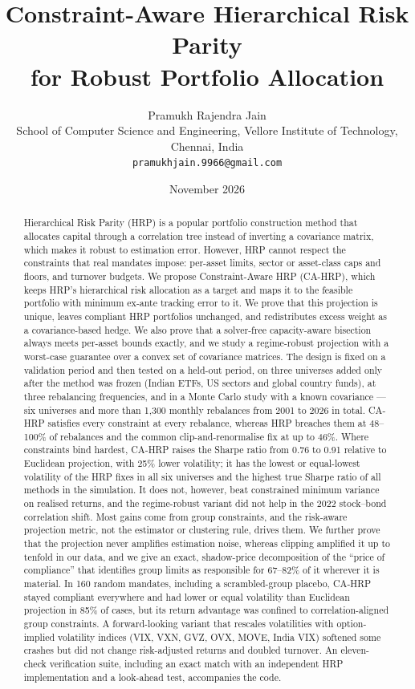 \documentclass[11pt]{article}
\title{Constraint-Aware Hierarchical Risk Parity\\for Robust Portfolio Allocation}
\author{Pramukh Rajendra Jain\\
\small School of Computer Science and Engineering, Vellore Institute of Technology, Chennai, India\\
\small \texttt{pramukhjain.9966@gmail.com}}
\date{November 2026}
\begin{document}
\maketitle

\begin{abstract}
Hierarchical Risk Parity (HRP) is a popular portfolio construction method that allocates
capital through a correlation tree instead of inverting a covariance matrix, which makes it
robust to estimation error. However, HRP cannot respect the constraints that real mandates
impose: per-asset limits, sector or asset-class caps and floors, and turnover budgets. We
propose Constraint-Aware HRP (CA-HRP), which keeps HRP's hierarchical risk allocation as a
target and maps it to the feasible portfolio with minimum ex-ante tracking error to it. We
prove that this projection is unique, leaves compliant HRP portfolios unchanged, and
redistributes excess weight as a covariance-based hedge. We also prove that a solver-free
capacity-aware bisection always meets per-asset bounds exactly, and we study a
regime-robust projection with a worst-case guarantee over a convex set of covariance
matrices. The design is fixed on a validation period and then tested on a held-out period,
on three universes added only after the method was frozen (Indian ETFs, US sectors and
global country funds), at three rebalancing frequencies, and in a Monte Carlo study with a
known covariance --- six universes and more than 1{,}300 monthly rebalances from 2001 to
2026 in total. CA-HRP satisfies every constraint at every rebalance, whereas HRP breaches
them at 48--100\% of rebalances and the common clip-and-renormalise fix at up to 46\%.
Where constraints bind hardest, CA-HRP raises the Sharpe ratio from 0.76 to 0.91 relative to
Euclidean projection, with 25\% lower volatility; it has the lowest or equal-lowest volatility
of the HRP fixes in all six universes and the highest true Sharpe ratio of all methods in the
simulation. It does not, however, beat constrained minimum variance on realised returns, and
the regime-robust variant did not help in the 2022 stock--bond correlation shift. Most gains
come from group constraints, and the risk-aware projection metric, not the estimator or
clustering rule, drives them. We further prove that the projection never amplifies estimation
noise, whereas clipping amplified it up to tenfold in our data, and we give an exact,
shadow-price decomposition of the ``price of compliance'' that identifies group limits as
responsible for 67--82\% of it wherever it is material. In 160 random mandates, including a
scrambled-group placebo, CA-HRP stayed compliant everywhere and had lower or equal volatility
than Euclidean projection in 85\% of cases, but its return advantage was confined to
correlation-aligned group constraints. A forward-looking variant that rescales volatilities with option-implied
volatility indices (VIX, VXN, GVZ, OVX, MOVE, India VIX) softened some crashes but did not
change risk-adjusted returns and doubled turnover. An eleven-check verification suite, including an
exact match with an independent HRP implementation and a look-ahead test, accompanies the
code.


\end{abstract}
\end{document}
